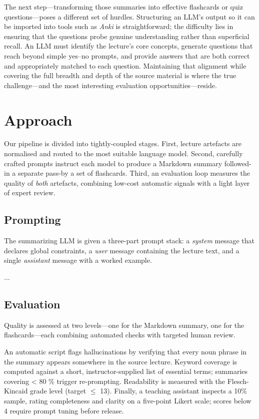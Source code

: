 \documentclass[
12pt,
paper=a4,
,captions=tableheading
]{scrartcl}
\begin{document}
	The next step—transforming those summaries into effective flashcards or quiz questions—poses a different set of hurdles. Structuring an LLM's output so it can be imported into tools such as \emph{Anki} is straightforward; the difficulty lies in ensuring that the questions probe genuine understanding rather than superficial recall. An LLM must identify the lecture’s core concepts, generate questions that reach beyond simple yes--no prompts, and provide answers that are both correct and appropriately matched to each question. Maintaining that alignment while covering the full breadth and depth of the source material is where the true challenge—and the most interesting evaluation opportunities—reside.
	
	\section{Approach}\label{approach}

	Our pipeline is divided into tightly-coupled stages. First, lecture artefacts are normalised and routed to the most suitable language model. Second, carefully crafted prompts instruct each model to produce a Markdown summary followed-in a separate pass-by a set of flashcards. Third, an evaluation loop measures the quality of \emph{both} artefacts, combining low-cost automatic signals with a light layer of expert review.

	\subsection{Prompting}

	The summarizing LLM is given a three-part prompt stack: a \emph{system} message that declares global constraints, a \emph{user} message containing the lecture text, and a single \emph{assistant} message with a worked example.

	...

	\subsection{Evaluation}

	Quality is assessed at two levels—one for the Markdown summary, one for the flashcards—each combining automated checks with targeted human review.

	An automatic script flags hallucinations by verifying that every noun phrase in the summary appears somewhere in the source lecture. Keyword coverage is computed against a short, instructor-supplied list of essential terms; summaries covering < 80 \% trigger re-prompting. Readability is measured with the Flesch-Kincaid grade level (target $\leqslant$ 13). Finally, a teaching assistant inspects a 10\% sample, rating completeness and clarity on a five-point Likert scale; scores below 4 require prompt tuning before release.
	
\end{document}

